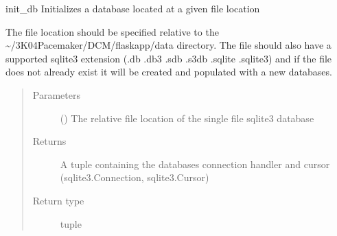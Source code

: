 \documentclass[letterpaper,10pt,english]{sphinxmanual}
\begin{document}
\begin{fulllineitems}
\label{\detokenize{index:data.database.init_db}}
init\_db Initializes a database located at a given file location

The file location should be specified relative to the \textasciitilde{}/3K04\sphinxhyphen{}Pacemaker/DCM/flaskapp/data
directory. The file should also have a supported sqlite3 extension (.db .db3 .sdb .s3db
.sqlite .sqlite3) and if the file does not already exist it will be created and
populated with a new databases.
\begin{quote}\begin{description}
\item[{Parameters}] \leavevmode
{} () \textendash{} The relative file location of the single file sqlite3 database

\item[{Returns}] \leavevmode
A tuple containing the databases connection handler and cursor (sqlite3.Connection, sqlite3.Cursor)

\item[{Return type}] \leavevmode
tuple

\end{description}\end{quote}

\end{fulllineitems}

\end{document}
